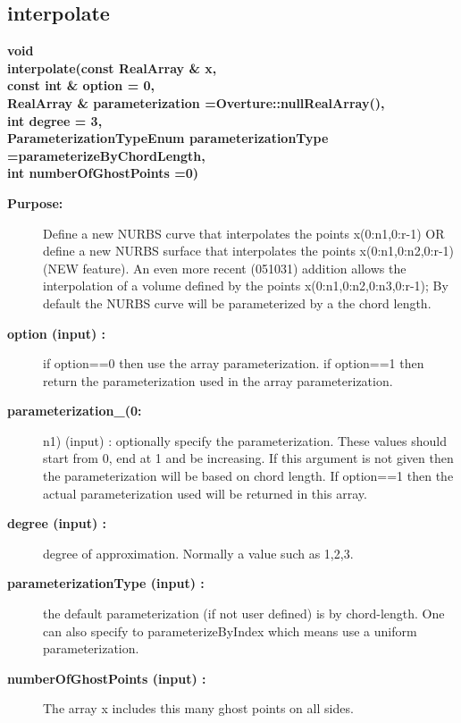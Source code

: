 \subsection{interpolate}
 
\begin{flushleft} \textbf{%
void  \\ 
\settowidth{\NurbsMappingIncludeArgIndent}{interpolate(}%
interpolate(const RealArray \& x, \\ 
\hspace{\NurbsMappingIncludeArgIndent}const int \& option     = 0,\\ 
RealArray \& parameterization  =Overture::nullRealArray(),\\ 
\hspace{\NurbsMappingIncludeArgIndent}int degree  = 3,\\ 
\hspace{\NurbsMappingIncludeArgIndent}ParameterizationTypeEnum parameterizationType  =parameterizeByChordLength,\\ 
\hspace{\NurbsMappingIncludeArgIndent}int numberOfGhostPoints  =0)
}\end{flushleft}
\begin{description}
\item[{\bf Purpose:}]  
    Define a new NURBS curve that interpolates the points x(0:n1,0:r-1) OR
 define a new NURBS surface that interpolates the points x(0:n1,0:n2,0:r-1) (NEW feature). 
 An even more recent (051031) addition allows the interpolation of a volume defined
 by the points x(0:n1,0:n2,0:n3,0:r-1);
  By default the NURBS curve will be parameterized by a the chord length.
 
\item[{\bf option (input) :}]  if option==0 then use the array parameterization.
     if option==1 then return the parameterization used in the array parameterization.
\item[{\bf parameterization\_(0:}] n1) (input) : optionally specify the parameterization. These values
 should start from 0, end at 1 and be increasing. If this argument is not given then
   the parameterization will be based on chord length. If option==1 then the 
   actual parameterization used will be returned in this array.
\item[{\bf degree (input) :}]  degree of approximation. Normally a value such as 1,2,3.
\item[{\bf parameterizationType (input) :}]  the default parameterization (if not user defined) is by chord-length.
       One can also specify to parameterizeByIndex which means use a uniform parameterization.
\item[{\bf numberOfGhostPoints (input) :}]  The array x includes this many ghost points on all sides.

\end{description}
